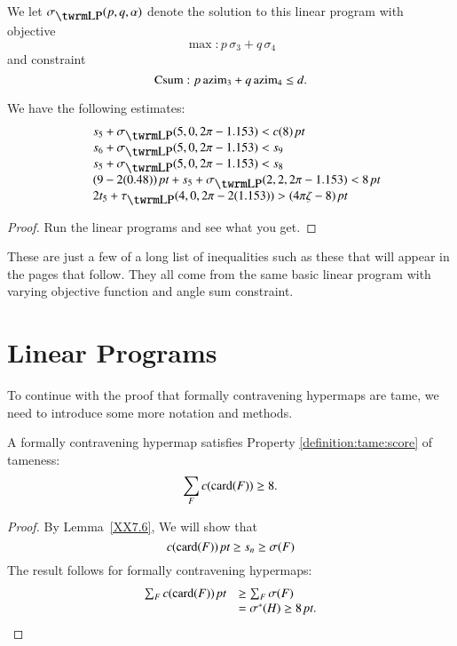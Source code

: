 We let $\sLP(p,q,\alpha)$ denote the solution to this linear program
with objective $$\max: p\, \sigma_3 + q\, \sigma_4$$ and constraint
$${\operatorname{Csum}}: p\, {\operatorname{azim}}_3 + q\,{\operatorname{azim}}_4 \le d.$$



\begin{lemma} We have the following estimates:
    $$
    \begin{array}{lll}
    &s_5+\sLP(5,0,2\pi-1.153)< c(8)\,\pt\\
    &s_6+\sLP(5,0,2\pi-1.153) < s_9\\
    &s_5+\sLP(5,0,2\pi-1.153)<s_8\\
    &(9-2(0.48))\,\pt+s_5+\sLP(2,2,2\pi-1.153)<8\,\pt\\
    &2t_5+\tauLP(4,0,2\pi-2(1.153))>\squander\\
    \end{array}
    $$
\end{lemma}

\begin{proof} Run the linear programs and see what you get.
\end{proof}

These are just a few of a long list of inequalities such as these
that will appear in the pages that follow.  They all come from the
same basic linear program with varying objective function and angle
sum constraint.

\section{Linear Programs} %
\label{sec:2.2}  To continue with the proof that formally
contravening hypermaps are tame, we need to introduce some more
notation and methods.



\begin{lemma}
    A formally contravening hypermap satisfies
    Property \ref{definition:tame:score} of tameness:
    $$\sum_F c({\operatorname{card}}(F)) \ge 8.$$
\end{lemma}

\begin{proof}  By Lemma~\ref{XX7.6},
We will show that
    \begin{equation}
    c({\operatorname{card}}(F))\,\hbox{\it pt} \ge s_n \ge \sigma(F)
    \label{eqn:sigma}
    \end{equation}
The result follows for formally contravening
    hypermaps:
    $$
    \begin{array}{lll}
        \sum_F c({\operatorname{card}}(F)) \,\hbox{\it pt} &\ge \sum_F \sigma(F) \\
            &= \sigma^*(H) \ge 8\,\hbox{\it pt}.
    \end{array}
    $$
\end{proof}

